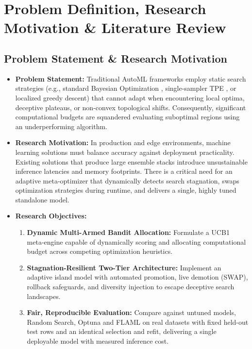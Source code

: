 \documentclass[11pt, a4paper]{article}
\begin{document}
\section{Problem Definition, Research Motivation \& Literature Review}

\subsection{Problem Statement \& Research Motivation}
\begin{itemize}[noitemsep, topsep=2pt]
    \item \textbf{Problem Statement:} Traditional AutoML frameworks \cite{feurer2019hyperparameter, bischl2023hyperparameter} employ static search strategies (e.g., standard Bayesian Optimization \cite{hutter2011sequential}, single-sampler TPE \cite{bergstra2011algorithms}, or localized greedy descent) that cannot adapt when encountering local optima, deceptive plateaus, or non-convex topological shifts. Consequently, significant computational budgets are squandered evaluating suboptimal regions using an underperforming algorithm.
    \item \textbf{Research Motivation:} In production and edge environments, machine learning solutions must balance accuracy against deployment practicality. Existing solutions that produce large ensemble stacks introduce unsustainable inference latencies and memory footprints. There is a critical need for an adaptive meta-optimizer that dynamically detects search stagnation, swaps optimization strategies during runtime, and delivers a single, highly tuned standalone model.
    \item \textbf{Research Objectives:}
    \begin{enumerate}[noitemsep, topsep=2pt]
        \item \textbf{Dynamic Multi-Armed Bandit Allocation:} Formulate a UCB1 meta-engine capable of dynamically scoring and allocating computational budget across competing optimization heuristics.
        \item \textbf{Stagnation-Resilient Two-Tier Architecture:} Implement an adaptive island model with automated promotion, live demotion (SWAP), rollback safeguards, and diversity injection to escape deceptive search landscapes.
        \item \textbf{Fair, Reproducible Evaluation:} Compare against untuned models, Random Search, Optuna and FLAML on real datasets with fixed held-out test rows and an identical selection and refit, delivering a single deployable model with measured inference cost.
    \end{enumerate}
\end{itemize}
\end{document}
